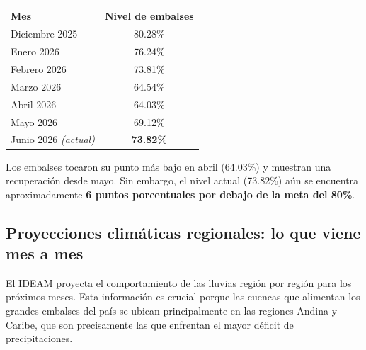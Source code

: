 \documentclass[11pt,a4paper]{article}
\newcommand{\EMBALSEACTUAL}{73.82\%}
\newcommand{\METAXM}{80\%}
\begin{document}
\begin{infobox}
\begin{center}
\small
\begin{tabular}{@{}lc@{}}
\toprule
\textbf{Mes} & \textbf{Nivel de embalses} \\
\midrule
Diciembre 2025 & 80.28\% \\
Enero 2026 & 76.24\% \\
Febrero 2026 & 73.81\% \\
Marzo 2026 & 64.54\% \\
Abril 2026 & 64.03\% \\
Mayo 2026 & 69.12\% \\
Junio 2026 \textit{(actual)} & \textbf{\EMBALSEACTUAL} \\
\bottomrule
\end{tabular}
\end{center}
\vspace{2mm}
Los embalses tocaron su punto más bajo en abril (64.03\%) y muestran una recuperación desde mayo. Sin embargo, el nivel actual (\EMBALSEACTUAL) aún se encuentra aproximadamente \textbf{6 puntos porcentuales por debajo de la meta del \METAXM}.
\end{infobox}

\subsection{Proyecciones climáticas regionales: lo que viene mes a mes}

El IDEAM proyecta el comportamiento de las lluvias región por región para los próximos meses. Esta información es crucial porque las cuencas que alimentan los grandes embalses del país se ubican principalmente en las regiones Andina y Caribe, que son precisamente las que enfrentan el mayor déficit de precipitaciones.
\end{document}
